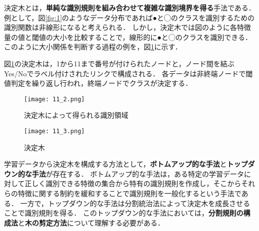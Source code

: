 \documentclass[dvipdfmx]{jreport}
\begin{document}
決定木とは，\textbf{単純な識別規則を組み合わせて複雑な識別境界を得る}手法である．
例として，図\ref{fig:1}のようなデータ分布であれば●と◯のクラスを識別するための識別関数は非線形になると考えられる．
しかし，決定木では図のように各特徴量の値と閾値の大小を比較することで，線形的に●と◯のクラスを識別できる．
このように大小関係を判断する過程の例を，図\ref{fig:2}に示す．

図\ref{fig:2}の決定木は，1から11まで番号が付けられたノードと，ノード間を結ぶYes/Noでラベル付けされたリンクで構成される．
各データは非終端ノードで閾値判定を繰り返し行われ，終端ノードでクラスが決定する．

\begin{figure}[h]
    \centering
    \begin{minipage}[b]{0.49\columnwidth}
        \centering
        \texttt{[image: 11\_2.png]}
        \caption{決定木によって得られる識別領域}\label{fig:1}
    \end{minipage}
    \centering
    \begin{minipage}[b]{0.49\columnwidth}
        \centering
        \texttt{[image: 11\_3.png]}
        \caption{決定木}\label{fig:2}
    \end{minipage}
\end{figure}

学習データから決定木を構成する方法として，\textbf{ボトムアップ的な手法}と\textbf{トップダウン的な手法}が存在する．
ボトムアップ的な手法は，ある特定の学習データに対して正しく識別できる特徴の集合から特有の識別規則を作成し，そこからそれらの特徴に関する制約を緩和することで識別規則を一般化するという手法である．
一方で，トップダウン的な手法は分割統治法によって決定木を成長させることで識別規則を得る．
このトップダウン的な手法においては，\textbf{分割規則の構成法}と\textbf{木の剪定方法}について理解する必要がある．
\end{document}
